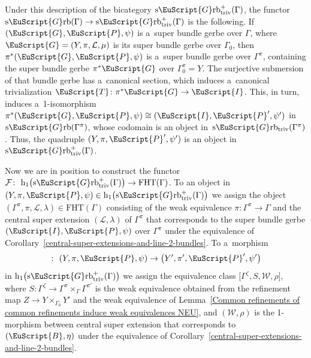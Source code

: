 \documentclass[10pt,a4paper]{amsart}
\numberwithin{equation}{section}
\def\mathscr#1{\EuScript{#1}}
\def\hc#1{\mathrm{h}_{#1}}
\newcommand{\Grb}{\mathscr{G}\mathrm{rb}}
\newcommand{\Grbtriv}{\mathscr{G}\mathrm{rb}_{\mathrm{triv}}}
\newcommand{\sGrb}{\mathrm{s}\Grb}
\newcommand{\sGrbtriv}{\mathrm{s}\Grbtriv}
\begin{document}
\begin{Remark}
Under this description of the bicategory $\sGrbtriv^{+}(\Gamma)$, the functor $\sGrb(\Gamma) \to \sGrbtriv^{+}(\Gamma)$ is the following. If $(\mathscr{G},\mathscr{P},\psi)$ is a~super bundle gerbe over $\Gamma$, where $\mathscr{G}=(Y,\pi,\mathcal{L},\mu)$ is its super bundle gerbe over $\Gamma_0$,
then $\pi^{*}(\mathscr{G},\mathscr{P},\psi)$ is a~super bundle gerbe over $\Gamma^{\pi}$, containing the super bundle gerbe $\pi^{*}\mathscr{G}$ over $\Gamma^{\pi}_0=Y$. The surjective submersion of that bundle gerbe has a~canonical section, which induces a~canonical trivialization $\mathscr{T}\colon \pi^{*}\mathscr{G} \to \mathscr{I}$. This, in turn, induces a~1-isomorphism $\pi^{*}(\mathscr{G},\mathscr{P},\psi) \cong (\mathscr{I},\mathscr{P}',\psi')$ in $\sGrb(\Gamma^{\pi})$, whose codomain is an object in~$\sGrbtriv(\Gamma^{\pi})$. Thus, the quadruple $(Y,\pi,\mathscr{P}',\psi')$ is an object in $\sGrbtriv^{+}(\Gamma)$.
\end{Remark}








Now we are in position to construct the functor
$
\mathcal{F}\colon\ \hc 1\bigl(\sGrbtriv^{+}(\Gamma)\bigr) \to \mathrm{FHT}(\Gamma)$.
 To an object in $(Y,\pi,\mathscr{P},\psi) \in \hc 1\bigl(\sGrbtriv^{+}(\Gamma)\bigr)$ we assign the object $(\Gamma^\pi,\pi,\mathcal{L},\lambda)\in\mathrm{FHT}(\Gamma)$ consisting of
 the weak equivalence $\pi\colon \Gamma^\pi \to \Gamma$ and the
 central super extension $(\mathcal{L},\lambda)$ of $\Gamma^{\pi}$ that corresponds to the super bundle gerbe $(\mathscr{I},\mathscr{P},\psi)$ over $\Gamma^{\pi}$ under the equivalence of Corollary~\ref{central-super-extensions-and-line-2-bundles}.
 To a~morphism
 \begin{equation*}
 [(Z,\zeta,\mathscr{B},\eta)] \colon\ (Y,\pi,\mathscr{P},\psi) \to \bigl(Y',\pi',\mathscr{P}',\psi'\bigr)
 \end{equation*}
 in $\hc 1\bigl(\sGrbtriv^{+}(\Gamma)\bigr)$ we assign the equivalence class
 $\big[\Gamma^{\zeta},S,\mathcal{W},\rho\big]$, where $S\colon \Gamma^{\zeta} \to \Gamma^\pi \times_{\Gamma} \Gamma^{\pi'}$ is the weak equivalence obtained from the refinement map $Z \to Y \times_{\Gamma_0} Y'$ and the weak equivalence of Lemma~\ref{Common refinements of common refinements induce weak equivalences NEU}, and $(\mathcal{W},\rho)$ is the 1-morphism between central super extension that corresponds to $(\mathscr{B},\eta)$ under the equivalence of Corollary~\ref{central-super-extensions-and-line-2-bundles}.
\end{document}
